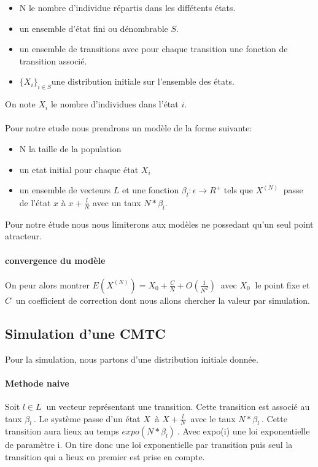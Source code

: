 \documentclass[a4paper]{article}
\begin{document}
\begin{itemize}
\item N le nombre d'individue répartis dans les diffétents états.
\item un ensemble d'état fini ou dénombrable $S$.
\item un ensemble de transitions avec pour chaque transition une
  fonction de transition associé.
\item $ \{ X_i \}_{i \in S}$une distribution initiale sur l'ensemble des états.
\end{itemize}

On note $X_i$ le nombre d'individues dans l'état $i$.

\paragraph{}
Pour notre etude nous prendrons un modèle de la forme suivante:
\begin{itemize}
\item N la taille de la population
\item un etat initial pour chaque état $X_i$
\item un ensemble de vecteurs $L$ et une fonction $\beta_l : \epsilon
  \rightarrow R^+$ tels que $X^{(N)} \ $ passe de l'état $x$ à
  $x+\frac{l}{N}$ avec un taux $N*\beta_l$.
\end{itemize}

Pour notre étude nous nous limiterons aux modèles ne possedant qu'un
seul point atracteur.

\paragraph{convergence du modèle}
On peur alors montrer $E(X^{(N)})=X_0+\frac{C}{N}+O(\frac{1}{N^2}) \ $
avec $X_0 \ $ le point fixe et $C \ $ un coefficient de correction
dont nous allons chercher la valeur par simulation. 

\subsection{Simulation d'une CMTC}

Pour la simulation, nous partons d'une distribution initiale
donnée.

\paragraph{Methode naive}

Soit $l \in L \ $ un vecteur représentant une transition. Cette
transition est associé au taux $\beta_l \ $. Le système passe d'un
état $X \ $ à $X+\frac{l}{N} \ $ avec le taux $N*\beta_l \ $. Cette
transition aura lieux au temps $expo(N*\beta_l) \ $. Avec expo(i) une
loi exponentielle de paramètre i. On tire donc une loi exponentielle
par transition puis seul la transition qui a lieux en premier est
prise en compte.
\end{document}
